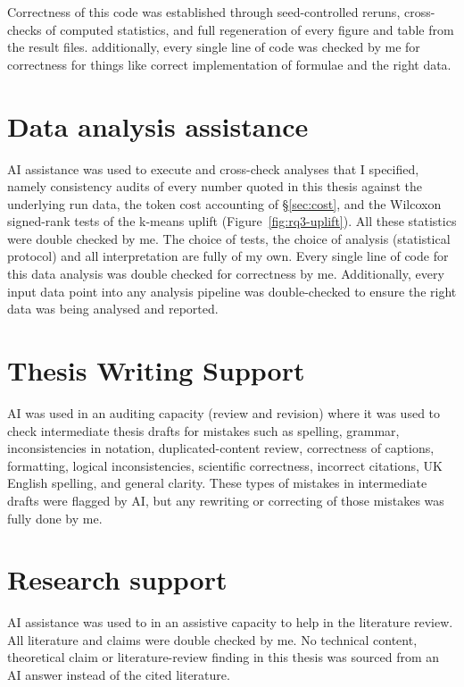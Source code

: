 \documentclass[11pt,a4paper,oneside]{report}
\begin{document}
Correctness of this code was
established through seed-controlled reruns, cross-checks of computed
statistics, and full regeneration of
every figure and table from the result files. additionally, every single line of code was checked by me for correctness for things like correct implementation of formulae and the right data.

\section*{Data analysis assistance}

AI assistance was used to execute and cross-check analyses that I specified,
namely consistency audits of every number quoted in this thesis against the
underlying run data, the token cost accounting of \S\ref{sec:cost}, and the
Wilcoxon signed-rank tests of the k-means uplift (Figure~\ref{fig:rq3-uplift}). All these statistics were double checked by me. The choice of tests, the choice of analysis (statistical protocol) and all
interpretation are fully of my own. Every single line of code for this data analysis was double checked for correctness by me. Additionally, every input data point into any analysis pipeline was double-checked to ensure the right data was being analysed and reported.

\section*{Thesis Writing Support}


AI was used in an auditing capacity (review and revision) where it was used to check intermediate thesis drafts for mistakes such as spelling, grammar, inconsistencies in notation, duplicated-content review, correctness of captions, formatting, logical inconsistencies, scientific correctness, incorrect citations, UK English spelling, and general clarity. These types of mistakes in intermediate drafts were flagged by AI, but any rewriting or correcting of those mistakes was fully done by me.


\section*{Research support}

AI assistance was used to in an assistive capacity to help in the literature review. All literature and claims were double checked by me. No technical content,
theoretical claim or literature-review finding in this thesis was sourced from an AI answer instead of the cited literature.
\end{document}
